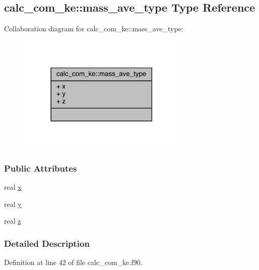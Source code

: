 \hypertarget{structcalc__com__ke_1_1mass__ave__type}{\subsection{calc\-\_\-com\-\_\-ke\-:\-:mass\-\_\-ave\-\_\-type Type Reference}
\label{structcalc__com__ke_1_1mass__ave__type}
}


Collaboration diagram for calc\-\_\-com\-\_\-ke\-:\-:mass\-\_\-ave\-\_\-type\-:
\nopagebreak
\begin{figure}[H]
\begin{center}
\leavevmode
\includegraphics[width=230pt]{structcalc__com__ke_1_1mass__ave__type__coll__graph}
\end{center}
\end{figure}
\subsubsection*{Public Attributes}
\begin{DoxyCompactItemize}
\item 
real \hyperlink{structcalc__com__ke_1_1mass__ave__type_ace118ced51b2035cd33acabc4815ece7}{x}
\item 
real \hyperlink{structcalc__com__ke_1_1mass__ave__type_aedc065f446af5e778bab2a0cdee453de}{y}
\item 
real \hyperlink{structcalc__com__ke_1_1mass__ave__type_a6817c41a4ce0d0f145edbab090ae72fb}{z}
\end{DoxyCompactItemize}


\subsubsection{Detailed Description}


Definition at line 42 of file calc\-\_\-com\-\_\-ke.\-f90.



